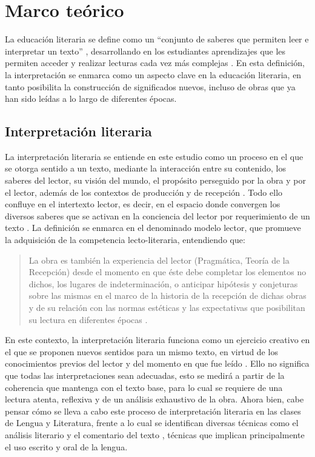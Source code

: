 \documentclass[spanish]{textolivre}
\begin{document}
\section{Marco teórico}\label{sec-normas}
La educación literaria se define como un “conjunto de saberes que permiten leer e interpretar un texto” \cite[p. 71]{mendoza_fillola_educacion_2004}, desarrollando en los estudiantes aprendizajes que les permiten acceder y realizar lecturas cada vez más complejas \cite{jover_educacion_2010}. En esta definición, la interpretación se enmarca como un aspecto clave en la educación literaria, en tanto posibilita la construcción de significados nuevos, incluso de obras que ya han sido leídas a lo largo de diferentes épocas.  

\subsection{Interpretación literaria}\label{sec-conduta}
La interpretación literaria se entiende en este estudio como un proceso en el que se otorga sentido a un texto, mediante la interacción entre su contenido, los saberes del lector, su visión del mundo, el propósito perseguido por la obra y por el lector, además de los contextos de producción y de recepción \cite{mendoza_fillola_lectura_1995,mendoza_fillola_tu_1998}. Todo ello confluye en el intertexto lector, es decir, en el espacio donde convergen los diversos saberes que se activan en la conciencia del lector por requerimiento de un texto \cite{garagalza_sentido_2014}. La definición se enmarca en el denominado modelo lector, que promueve la adquisición de la competencia lecto-literaria, entendiendo que: 

\begin{quote}
    La obra es también la experiencia del lector (Pragmática, Teoría de la Recepción) desde el momento en que éste debe completar los elementos no dichos, los lugares de indeterminación, o anticipar hipótesis y conjeturas sobre las mismas en el marco de la historia de la recepción de dichas obras y de su relación con las normas estéticas y las expectativas que posibilitan su lectura en diferentes épocas \cite[p. 30]{nunez_molina_modelos_2016}.
\end{quote}

En este contexto, la interpretación literaria funciona como un ejercicio creativo en el que se proponen nuevos sentidos para un mismo texto, en virtud de los conocimientos previos del lector y del momento en que fue leído \cite{ministerio_de_educacion_bases_2019}. Ello no significa que todas las interpretaciones sean adecuadas, esto se medirá a partir de la coherencia que mantenga con el texto base, para lo cual se requiere de una lectura atenta, reflexiva y de un análisis exhaustivo de la obra. Ahora bien, cabe pensar cómo se lleva a cabo este proceso de interpretación literaria en las clases de Lengua y Literatura, frente a lo cual se identifican diversas técnicas como el análisis literario y el comentario del texto \cite{cassany_taller_2006}, técnicas que implican principalmente el uso escrito y oral de la lengua. 
\end{document}
